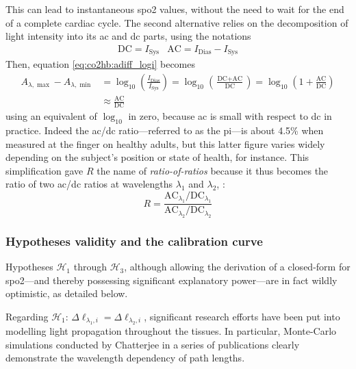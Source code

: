 This can lead to instantaneous \gls{spo2} values, without the need to wait for the end of a complete cardiac cycle\cite{vazquezjaccaud2011}. The second alternative relies on the decomposition of light intensity into its \gls{ac} and \gls{dc} parts, \ie{} using the notations
\begin{eqnarray}
	\text{DC} = I_{\text{Sys}} & \text{AC} = I_{\text{Dias}} - I_{\text{Sys}}
\end{eqnarray}
Then, equation \ref{eq:co2hb:adiff_logi} becomes
\begin{equation}
	\begin{aligned}
		A_{\lambda,\max} - A_{\lambda,\min} &= \log_{10}\left(\frac{I_\text{Dias}}{I_\text{Sys}}\right) = \log_{10} \left( \frac{\text{DC} + \text{AC}}{\text{DC}} \right) = \log_{10} \left(1 + \frac{\text{AC}}{\text{DC}}\right)\\
		&\approx \frac{\text{AC}}{\text{DC}}
	\end{aligned}
\end{equation}
using an equivalent of $\log_{10}$ in zero, because \gls{ac} is small with respect to \gls{dc} in practice. Indeed the \gls{ac}/\gls{dc} ratio---referred to as the \gls{pi}---is about 4.5\% when measured at the finger on healthy adults\cite{tapar2018, fodor2022}, but this latter figure varies widely depending on the subject's position\cite{rathgeber1996, tapar2018} or state of health\cite{sivaprasath2019}, for instance. This simplification gave $R$ the name of \emph{ratio-of-ratios}\cite{nitzan2014} because it thus becomes the ratio of two \gls{ac}/\gls{dc} ratios at wavelengths $\lambda_1$ and $\lambda_2$, \ie{}:
\begin{equation}
	R = \frac{\text{AC}_{\lambda_1} / \text{DC}_{\lambda_1}}{\text{AC}_{\lambda_2} /\text{DC}_{\lambda_2}}
\end{equation}

\subsubsection{Hypotheses validity and the calibration curve}

Hypotheses $\mathcal{H}_1$ through $\mathcal{H}_3$, although allowing the derivation of a closed-form for \gls{spo2}---and thereby possessing significant explanatory power---are in fact wildly optimistic, as detailed below.

Regarding $\mathcal{H}_1$: $\Delta\ell_{\lambda_1, i} = \Delta\ell_{\lambda_2, i}$, significant research efforts have been put into modelling light propagation throughout the tissues. In particular, Monte-Carlo simulations conducted by Chatterjee \etal{} in a series of publications\cite{chatterjee2017, chatterjee2018, chatterjee2019, chatterjee2020} clearly demonstrate the wavelength dependency of path lengths.

